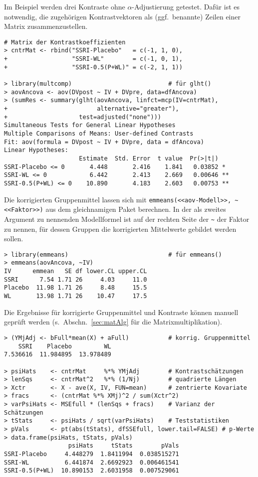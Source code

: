 Im Beispiel werden drei Kontraste ohne $\alpha$-Adjustierung getestet. Dafür ist es notwendig, die zugehörigen Kontrastvektoren als (ggf.\ benannte) Zeilen einer Matrix zusammenzustellen.
\begin{lstlisting}
# Matrix der Kontrastkoeffizienten
> cntrMat <- rbind("SSRI-Placebo"   = c(-1, 1, 0),
+                  "SSRI-WL"        = c(-1, 0, 1),
+                  "SSRI-0.5(P+WL)" = c(-2, 1, 1))

> library(multcomp)                           # für glht()
> aovAncova <- aov(DVpost ~ IV + DVpre, data=dfAncova)
> (sumRes <- summary(glht(aovAncova, linfct=mcp(IV=cntrMat),
+                         alternative="greater"),
+                    test=adjusted("none")))
Simultaneous Tests for General Linear Hypotheses
Multiple Comparisons of Means: User-defined Contrasts
Fit: aov(formula = DVpost ~ IV + DVpre, data = dfAncova)
Linear Hypotheses:
                     Estimate  Std. Error  t value  Pr(>|t|)
SSRI-Placebo <= 0       4.448       2.416    1.841   0.03852 *
SSRI-WL <= 0            6.442       2.413    2.669   0.00646 **
SSRI-0.5(P+WL) <= 0    10.890       4.183    2.603   0.00753 **
\end{lstlisting}

Die korrigierten Gruppenmittel lassen sich mit \lstinline!emmeans(<<aov-Modell>>, ~<<Faktor>>)! aus dem gleichnamigen Paket berechnen. In der als zweites Argument zu nennenden Modellformel ist auf der rechten Seite der \lstinline!~! der Faktor zu nennen, für dessen Gruppen die korrigierten Mittelwerte gebildet werden sollen.
\begin{lstlisting}
> library(emmeans)                            # für emmeans()
> emmeans(aovAncova, ~IV)
IV      emmean   SE df lower.CL upper.CL
SSRI      7.54 1.71 26     4.03     11.0
Placebo  11.98 1.71 26     8.48     15.5
WL       13.98 1.71 26    10.47     17.5
\end{lstlisting}

Die Ergebnisse für korrigierte Gruppenmittel und Kontraste können manuell geprüft werden (s.\ Abschn.\ \ref{sec:matAlg} für die Matrixmultiplikation).
\begin{lstlisting}
> (YMjAdj <- bFull*mean(X) + aFull)           # korrig. Gruppenmittel
    SSRI    Placebo         WL 
7.536616  11.984895  13.978489

> psiHats    <- cntrMat     %*% YMjAdj        # Kontrastschätzungen
> lenSqs     <- cntrMat^2   %*% (1/Nj)        # quadrierte Längen
> Xctr       <- X - ave(X, IV, FUN=mean)      # zentrierte Kovariate
> fracs      <- (cntrMat %*% XMj)^2 / sum(Xctr^2)
> varPsiHats <- MSEfull * (lenSqs + fracs)    # Varianz der Schätzungen
> tStats     <- psiHats / sqrt(varPsiHats)    # Teststatistiken
> pVals      <- pt(abs(tStats), dfSSEfull, lower.tail=FALSE) # p-Werte
> data.frame(psiHats, tStats, pVals)
                  psiHats     tStats        pVals
SSRI-Placebo     4.448279  1.8411994  0.038515271
SSRI-WL          6.441874  2.6692923  0.006461541
SSRI-0.5(P+WL)  10.890153  2.6031958  0.007529061
\end{lstlisting}

